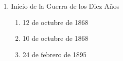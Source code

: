 \documentclass[twocolumn]{article}
\begin{document}
\begin{enumerate}
  \item Inicio de la Guerra de los Diez Años

  \begin{enumerate}
   
   \item 12 de octubre de 1868
   
   \item 10 de octubre de 1868
   
   \item 24 de febrero de 1895
   
  \end{enumerate}


\end{enumerate}


\end{document}
